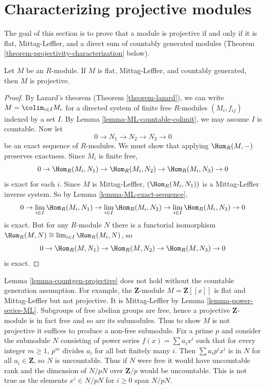 \section{Characterizing projective modules}
\label{section-characterize-projective}

\noindent
The goal of this section is to prove that a module is projective if and only if
it is flat, Mittag-Leffler, and a direct sum of countably generated modules
(Theorem \ref{theorem-projectivity-characterization} below).

\begin{lemma}
\label{lemma-countgen-projective}
Let $M$ be an $R$-module.  If $M$ is flat, Mittag-Leffler, and countably
generated, then $M$ is projective.
\end{lemma}

\begin{proof}
By Lazard's theorem (Theorem \ref{theorem-lazard}), we can write $M =
\colim_{i
\in I} M_i$ for a directed system of finite free $R$-modules $(M_i, f_{ij})$
indexed by a set $I$.  By Lemma \ref{lemma-ML-countable-colimit}, we may assume
$I$ is countable.  Now let
$$
0 \to N_1 \to N_2 \to N_3 \to 0
$$
be an exact sequence of $R$-modules.  We must show that applying
$\Hom_R(M, -)$
preserves exactness.  Since $M_i$ is finite free,
$$
0 \to \Hom_R(M_i, N_1) \to \Hom_R(M_i, N_2) \to
\Hom_R(M_i, N_3) \to 0
$$
is exact for each $i$.  Since $M$ is Mittag-Leffler, $(\Hom_R(M_i,
N_{1}))$ is
a Mittag-Leffler inverse system.  So by Lemma \ref{lemma-ML-exact-sequence},
$$
0 \to \lim_{i \in I} \Hom_R(M_i, N_1) \to
\lim_{i \in I} \Hom_R(M_i, N_2) \to
\lim_{i \in I} \Hom_R(M_i, N_3) \to 0
$$
is exact.  But for any $R$-module $N$ there is a functorial isomorphism
$\Hom_R(M, N) \cong \lim_{i \in I} \Hom_R(M_i, N)$, so
$$
0 \to \Hom_R(M, N_1) \to \Hom_R(M, N_2) \to
\Hom_R(M, N_3) \to 0
$$
is exact.
\end{proof}

\begin{remark}
\label{remark-characterize-projective}
Lemma \ref{lemma-countgen-projective} does not hold without the countable
generation assumption.  For example, the $\mathbf Z$-module $M =
\mathbf{Z}[[x]]$ is flat and Mittag-Leffler but not projective.  It is
Mittag-Leffler by Lemma \ref{lemma-power-series-ML}.  Subgroups of free abelian
groups are free, hence a projective $\mathbf Z$-module is in fact free and so
are its submodules.  Thus to show $M$ is not projective it suffices to produce
a non-free submodule.  Fix a prime $p$ and consider the submodule $N$
consisting of power series $f(x) = \sum a_i x^i$ such that for every integer $m
\geq 1$, $p^m$ divides $a_i$ for all but finitely many $i$.  Then $\sum a_i p^i
x^i$ is in $N$ for all $a_i \in \mathbf{Z}$, so $N$ is uncountable.  Thus if
$N$ were free it would have uncountable rank and the dimension of $N/pN$ over
$\mathbf{Z}/p$ would be uncountable.  This is not true as the elements $x^i \in
N/pN$ for $i \geq 0$ span $N/pN$.
\end{remark}

